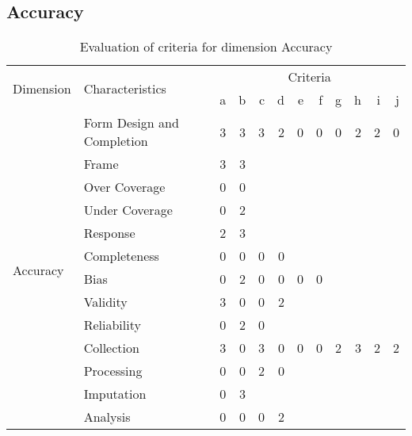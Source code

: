 \newpage
\subsection{Accuracy}

\begin{table}[htbp]
    \centering

    \begin{tabular}{llrrrrrrrrrr}
        \toprule
        \multirow{2}{*}{Dimension}  & \multirow{2}{*}{Characteristics}  & \multicolumn{10}{c}{Criteria}         \\ \cmidrule(lr){3-12}
                                    &                                   & a & b & c & d & e & f & g & h & i & j \\ \midrule
        \multirow{13}{*}{Accuracy}  & Form Design and Completion        & 3 & 3 & 3 & 2 & 0 & 0 & 0 & 2 & 2 & 0 \\
                                    & Frame                             & 3 & 3 &   &   &   &   &   &   &   &   \\
                                    & Over Coverage                     & 0 & 0 &   &   &   &   &   &   &   &   \\
                                    & Under Coverage                    & 0 & 2 &   &   &   &   &   &   &   &   \\
                                    & Response                          & 2 & 3 &   &   &   &   &   &   &   &   \\
                                    & Completeness                      & 0 & 0 & 0 & 0 &   &   &   &   &   &   \\
                                    & Bias                              & 0 & 2 & 0 & 0 & 0 & 0 &   &   &   &   \\
                                    & Validity                          & 3 & 0 & 0 & 2 &   &   &   &   &   &   \\
                                    & Reliability                       & 0 & 2 & 0 &   &   &   &   &   &   &   \\
                                    & Collection                        & 3 & 0 & 3 & 0 & 0 & 0 & 2 & 3 & 2 & 2 \\
                                    & Processing                        & 0 & 0 & 2 & 0 &   &   &   &   &   &   \\
                                    & Imputation                        & 0 & 3 &   &   &   &   &   &   &   &   \\
                                    & Analysis                          & 0 & 0 & 0 & 2 &   &   &   &   &   &   \\
        \bottomrule
    \end{tabular}

    \caption{Evaluation of criteria for dimension Accuracy}
    \label{table:accuracy-benchmark}
\end{table}
\FloatBarrier

